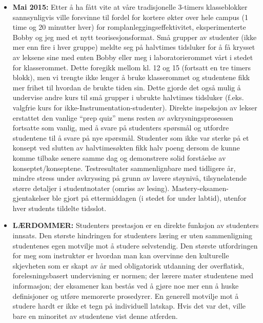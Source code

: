 \begin{itemize}
\item{} {\bf Mai 2015:} Etter å ha fått vite at våre tradisjonelle 3-timers klasseblokker sannsynligvis ville forsvinne til fordel for kortere økter over hele campus (1 time og 20 minutter hver) for romplanleggingseffektivitet, eksperimenterte Bobby og jeg med et nytt teorisesjonsformat.  Små grupper av studenter (ikke mer enn fire i hver gruppe) meldte seg på halvtimes tidsluker for å få krysset av leksene sine med enten Bobby eller meg i laboratorierommet vårt i stedet for klasserommet.  Dette foregikk mellom kl. 12 og 15 (fortsatt en tre timers blokk), men vi trengte ikke lenger å bruke klasserommet og studentene fikk mer frihet til hvordan de brukte tiden sin.  Dette gjorde det også mulig å undervise andre kurs til små grupper i ubrukte halvtimes tidsluker (f.eks. valgfrie kurs for ikke-Instrumentation-studenter).  Direkte inspeksjon av lekser erstattet den vanlige ``prep quiz'' mens resten av avkrysningsprosessen fortsatte som vanlig, med å svare på studenters spørsmål og utfordre studentene til å svare på nye spørsmål.  Studenter som ikke var sterke på et konsept ved slutten av halvtimesøkten fikk halv poeng dersom de kunne komme tilbake senere samme dag og demonstrere solid forståelse av konseptet/konseptene.  Testresultater sammenlignbare med tidligere år, mindre stress under avkryssing på grunn av lavere støynivå, tilsynelatende større detaljer i studentnotater (omriss av lesing).  Mastery-eksamen-gjentakelser ble gjort på ettermiddagen (i stedet for under labtid), utenfor hver students tildelte tidsslot.
\vskip 10pt
\item{} {\bf LÆRDOMMER:} Studenters prestasjon er en direkte funksjon av studenters innsats.  Den største hindringen for studenters læring er uten sammenligning studentenes egen motvilje mot å studere selvstendig.  Den største utfordringen for meg som instruktør er hvordan man kan overvinne den kulturelle skjevheten som er skapt av år med obligatorisk utdanning der overflatisk, forelesningsbasert undervisning er normen; der lærere mater studentene med informasjon; der eksamener kan bestås ved å gjøre noe mer enn å huske definisjoner og utføre memorerte prosedyrer.  En generell motvilje mot å studere hardt er ikke et tegn på individuell latskap.  Hvis det var det, ville bare en minoritet av studentene vist denne atferden.
\end{itemize}




